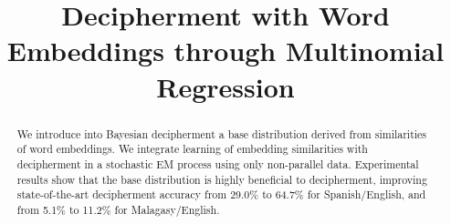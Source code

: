 \documentclass[11pt]{article}
\title{Decipherment with Word Embeddings through Multinomial Regression}
\date{}
\begin{document}
\maketitle
\begin{abstract}
We introduce into Bayesian decipherment a base distribution derived from similarities of word embeddings. We integrate learning of embedding similarities with decipherment in a stochastic EM process using only non-parallel data. Experimental results show that the base distribution is highly beneficial to decipherment, improving state-of-the-art decipherment accuracy from 29.0\% to 64.7\% for Spanish/English, and from 5.1\% to 11.2\% for Malagasy/English. 
\end{abstract}




%
%








\end{document}
